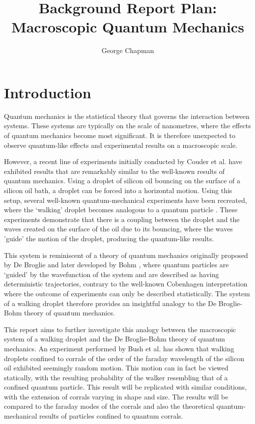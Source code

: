 \documentclass[11pt,twocolumn]{article}
\author{George Chapman}
\title{Background Report Plan: Macroscopic Quantum Mechanics}
\begin{document}
\maketitle

\section{Introduction}
\label{sec:introduction}

Quantum mechanics is the statistical theory that governs the interaction between systems.  These systems are typically on the scale of nanometres, where the effects of quantum mechanics become most significant.  It is therefore unexpected to observe quantum-like effects and experimental results on a macroscopic scale.

However, a recent line of experiments initially conducted by Couder et al.\cite{1} have exhibited results that are remarkably similar to the well-known results of quantum mechanics.  Using a droplet of silicon oil bouncing on the surface of a silicon oil bath, a droplet can be forced into a horizontal motion.  Using this setup, several well-known quantum-mechanical experiments have been recreated, where the `walking' droplet becomes analogous to a quantum particle \cite{1,6,7,9}.  These experiments demonstrate that there is a coupling between the droplet and the waves created on the surface of the oil due to its bouncing, where the waves 'guide' the motion of the droplet, producing the quantum-like results.

This system is reminiscent of a theory of quantum mechanics originally proposed by De Broglie and later developed by Bohm \cite{17}, where quantum particles are `guided' by the wavefunction of the system and are described as having deterministic trajectories, contrary to the well-known Cobenhagen interpretation where the outcome of experiments can only be described statistically.  The system of a walking droplet therefore provides an insightful analogy to the De Broglie-Bohm theory of quantum mechanics.

This report aims to further investigate this analogy between the macroscopic system of a walking droplet and the De Broglie-Bohm theory of quantum mechanics.  An experiment performed by Bush et al.\cite{12} has shown that walking droplets confined to corrals of the order of the faraday wavelength of the silicon oil exhibited seemingly random motion.  This motion can in fact be viewed statically, with the resulting probability of the walker resembling that of a confined quantum particle.  This result will be replicated with similar conditions, with the extension of corrals varying in shape and size.  The results will be compared to the faraday modes of the corrals and also the theoretical quantum-mechanical results of particles confined to quantum corrals.
\end{document}

